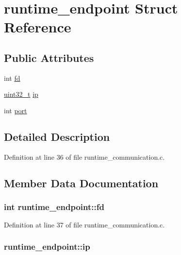 \hypertarget{structruntime__endpoint}{\section{runtime\-\_\-endpoint Struct Reference}
\label{structruntime__endpoint}
}
\subsection*{Public Attributes}
\begin{DoxyCompactItemize}
\item 
int \hyperlink{structruntime__endpoint_a24f38117a184460e87612dc22b9c5669}{fd}
\item 
\hyperlink{msus_2webserver_2uthash_8h_a435d1572bf3f880d55459d9805097f62}{uint32\-\_\-t} \hyperlink{structruntime__endpoint_a1df7434bdf4e9d66371e54f81e1ceb0d}{ip}
\item 
int \hyperlink{structruntime__endpoint_a9b80d9b279d096c6f7c6628e60665c00}{port}
\end{DoxyCompactItemize}


\subsection{Detailed Description}


Definition at line 36 of file runtime\-\_\-communication.\-c.



\subsection{Member Data Documentation}
\hypertarget{structruntime__endpoint_a24f38117a184460e87612dc22b9c5669}{
\subsubsection[{fd}]{\setlength{\rightskip}{0pt plus 5cm}int runtime\-\_\-endpoint\-::fd}}\label{structruntime__endpoint_a24f38117a184460e87612dc22b9c5669}


Definition at line 37 of file runtime\-\_\-communication.\-c.

\hypertarget{structruntime__endpoint_a1df7434bdf4e9d66371e54f81e1ceb0d}{
\subsubsection[{ip}]{ runtime\-\_\-endpoint\-::ip}}\label{structruntime__endpoint_a1df7434bdf4e9d66371e54f81e1ceb0d}


